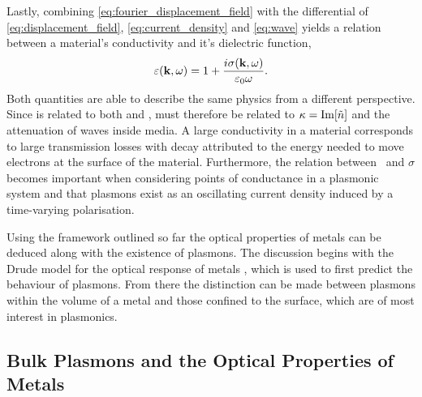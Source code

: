 \documentclass{article}
\begin{document}
Lastly, combining \eqref{eq:fourier_displacement_field} with the differential of \eqref{eq:displacement_field}, \eqref{eq:current_density} and \eqref{eq:wave}
yields a relation between a material's conductivity and it's dielectric function,
\begin{equation}
	\varepsilon(\mathbf{k}, \omega) = 1 + \frac{i\sigma(\mathbf{k}, \omega)}{\varepsilon_0\omega}.
	\label{eq:dielectric_conductivity}
\end{equation}
Both quantities are able to describe the same physics from a different perspective.
Since \real{\eps} is related to both \imag{\sigma} and , \real{\sigma} must therefore be related to $\kappa=\mathrm{Im}\!\left[{\tilde{n}}\right]$ and the attenuation of waves inside media. A large conductivity in a material corresponds to large transmission losses with decay attributed to the energy needed to move electrons at the surface of the material. Furthermore, the relation between \dielectric\ and $\sigma$ becomes important when considering points of conductance in a plasmonic system and that plasmons exist as an oscillating current density induced by a time-varying polarisation.

Using the framework outlined so far the optical properties of metals can be deduced along with the existence of plasmons. The discussion begins with the Drude model for the optical response of metals \cite{drude1900}, which is used to first predict the behaviour of plasmons. From there the distinction can be made between plasmons within the volume of a metal and those confined to the surface, which are of most interest in plasmonics.

\subsection{Bulk Plasmons and the Optical Properties of Metals}
\end{document}
